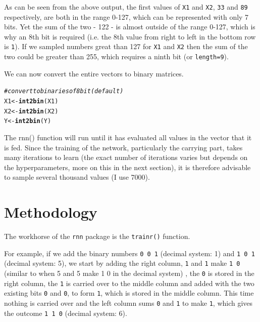 \documentclass[british]{article}\usepackage[]{graphicx}\usepackage[]{color}
\makeatletter
\newcommand{\hlcom}[1]{\textcolor[rgb]{0.678,0.584,0.686}{\textit{#1}}}%
\newcommand{\hlstd}[1]{\textcolor[rgb]{0.345,0.345,0.345}{#1}}%
\newcommand{\hlkwb}[1]{\textcolor[rgb]{0.69,0.353,0.396}{#1}}%
\newcommand{\hlkwd}[1]{\textcolor[rgb]{0.737,0.353,0.396}{\textbf{#1}}}%
\newenvironment{kframe}{%
 \def\at@end@of@kframe{}%
 \ifinner\ifhmode%
  \def\at@end@of@kframe{\end{minipage}}%
  \begin{minipage}{\columnwidth}%
 \fi\fi%
 \def\FrameCommand##1{\hskip\@totalleftmargin \hskip-\fboxsep
 \colorbox{shadecolor}{##1}\hskip-\fboxsep
     \hskip-\linewidth \hskip-\@totalleftmargin \hskip\columnwidth}%
 \MakeFramed {\advance\hsize-\width
   \@totalleftmargin\z@ \linewidth\hsize
   \@setminipage}}%
 {\par\unskip\endMakeFramed%
 \at@end@of@kframe}
\newenvironment{knitrout}{}{} %
\newcommand{\code}[1]{\texttt{#1}}
\makeatother
\begin{document}
As can be seen from the above output, the first values of \code{X1}
and \code{X2}, \code{33} and \code{89} respectively, are both in
the range 0-127, which can be represented with only 7 bits. Yet the
sum of the two - 122 - is almost outside of the range 0-127, which
is why an 8th bit is required (i.e. the 8th value from right to left
in the bottom row is \code{1}). If we sampled numbers great than
127 for \code{X1} and \code{X2} then the sum of the two could be
greater than 255, which requires a ninth bit (or \code{length=9}).

We can now convert the entire vectors to binary matrices.

\begin{knitrout}
\color{fgcolor}\begin{kframe}
\begin{alltt}
\hlcom{# convert to binaries of 8 bit (default)}
\hlstd{X1} \hlkwb{<-} \hlkwd{int2bin}\hlstd{(X1)}
\hlstd{X2} \hlkwb{<-} \hlkwd{int2bin}\hlstd{(X2)}
\hlstd{Y}  \hlkwb{<-} \hlkwd{int2bin}\hlstd{(Y)}
\end{alltt}
\end{kframe}
\end{knitrout}

The rnn() function will run until it has evaluated all values in the
vector that it is fed. Since the training of the network, particularly
the carrying part, takes many iterations to learn (the exact number
of iterations varies but depends on the hyperparameters, more on this
in the next section), it is therefore advisable to sample several
thousand values (I use 7000).


\section{Methodology}

The workhorse of the \code{rnn} package is the \code{trainr()} function.

For example, if we add the binary numbers \code{0 0 1} (decimal system:
1) and \code{1 0 1} (decimal system: 5), we start by adding the right
column, \code{1} and \code{1} make \code{1 0} (similar to when
5 and 5 make 1 0 in the decimal system) , the \code{0} is stored
in the right column, the \code{1} is carried over to the middle column
and added with the two existing bits \code{0} and \code{0}, to form
\code{1}, which is stored in the middle column. This time nothing
is carried over and the left column sums \code{0} and \code{1} to
make \code{1}, which gives the outcome \code{1 1 0} (decimal system:
6).
\end{document}
